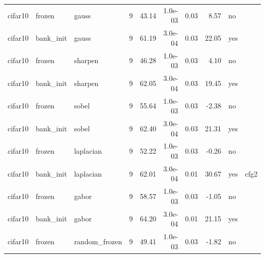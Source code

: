 \begin{table}[htbp]
{\begin{tabular}{@{}lllrrrrrll@{}}
cifar10 & frozen & gauss & 9 & 43.14 & 1.0e-03 & 0.03 & 8.57 & no &  \\
cifar10 & bank\_init & gauss & 9 & 61.19 & 3.0e-04 & 0.03 & 22.05 & yes &  \\
cifar10 & frozen & sharpen & 9 & 46.28 & 1.0e-03 & 0.03 & 4.10 & no &  \\
cifar10 & bank\_init & sharpen & 9 & 62.05 & 3.0e-04 & 0.03 & 19.45 & yes &  \\
cifar10 & frozen & sobel & 9 & 55.64 & 1.0e-03 & 0.03 & -2.38 & no &  \\
cifar10 & bank\_init & sobel & 9 & 62.40 & 3.0e-04 & 0.03 & 21.31 & yes &  \\
cifar10 & frozen & laplacian & 9 & 52.22 & 1.0e-03 & 0.03 & -0.26 & no &  \\
cifar10 & bank\_init & laplacian & 9 & 62.01 & 3.0e-04 & 0.01 & 30.67 & yes & cfg2 \\
cifar10 & frozen & gabor & 9 & 58.57 & 1.0e-03 & 0.03 & -1.05 & no &  \\
cifar10 & bank\_init & gabor & 9 & 64.20 & 3.0e-04 & 0.01 & 21.15 & yes &  \\
cifar10 & frozen & random\_frozen & 9 & 49.41 & 1.0e-03 & 0.03 & -1.82 & no &  \\
\bottomrule
\end{tabular}}
\end{table}
